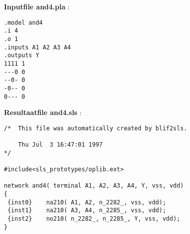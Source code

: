 {\bf Inputfile and4.pla} :
\begin{verbatim}
.model and4
.i 4
.o 1
.inputs A1 A2 A3 A4
.outputs Y
1111 1
---0 0
--0- 0
-0-- 0
0--- 0
\end{verbatim}

{\bf Resultaatfile and4.sls} :
\begin{verbatim}
/*  This file was automatically created by blif2sls.

    Thu Jul  3 16:47:01 1997
*/

#include<sls_prototypes/oplib.ext>

network and4( terminal A1, A2, A3, A4, Y, vss, vdd)
{
 {inst0}    na210( A1, A2, n_2282_, vss, vdd);
 {inst1}    na210( A3, A4, n_2285_, vss, vdd);
 {inst2}    no210( n_2282_, n_2285_, Y, vss, vdd);
}
\end{verbatim} 
\cleardoublepage
